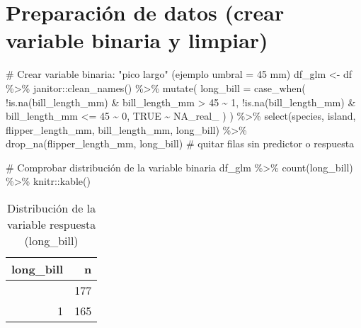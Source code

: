 \documentclass[
  spanish,
  11pt,
  a4paper,
  DIV=11,
  numbers=noendperiod]{scrartcl}
\newenvironment{Shaded}{\begin{snugshade}}{\end{snugshade}}
\newcommand{\AttributeTok}[1]{\textcolor[rgb]{0.40,0.45,0.13}{#1}}
\newcommand{\CommentTok}[1]{\textcolor[rgb]{0.37,0.37,0.37}{#1}}
\newcommand{\ConstantTok}[1]{\textcolor[rgb]{0.56,0.35,0.01}{#1}}
\newcommand{\DecValTok}[1]{\textcolor[rgb]{0.68,0.00,0.00}{#1}}
\newcommand{\FunctionTok}[1]{\textcolor[rgb]{0.28,0.35,0.67}{#1}}
\newcommand{\NormalTok}[1]{\textcolor[rgb]{0.00,0.23,0.31}{#1}}
\newcommand{\OtherTok}[1]{\textcolor[rgb]{0.00,0.23,0.31}{#1}}
\newcommand{\SpecialCharTok}[1]{\textcolor[rgb]{0.37,0.37,0.37}{#1}}
\begin{document}
\section{Preparación de datos (crear variable binaria y
limpiar)}\label{preparaciuxf3n-de-datos-crear-variable-binaria-y-limpiar}

\begin{Shaded}
\begin{Highlighting}[numbers=left,,]
\CommentTok{\# Crear variable binaria: "pico largo" (ejemplo umbral = 45 mm)}
\NormalTok{df\_glm }\OtherTok{\textless{}{-}}\NormalTok{ df }\SpecialCharTok{\%\textgreater{}\%}
\NormalTok{  janitor}\SpecialCharTok{::}\FunctionTok{clean\_names}\NormalTok{() }\SpecialCharTok{\%\textgreater{}\%}
  \FunctionTok{mutate}\NormalTok{(}
    \AttributeTok{long\_bill =} \FunctionTok{case\_when}\NormalTok{(}
      \SpecialCharTok{!}\FunctionTok{is.na}\NormalTok{(bill\_length\_mm) }\SpecialCharTok{\&}\NormalTok{ bill\_length\_mm }\SpecialCharTok{\textgreater{}} \DecValTok{45} \SpecialCharTok{\textasciitilde{}} \DecValTok{1}\NormalTok{,}
      \SpecialCharTok{!}\FunctionTok{is.na}\NormalTok{(bill\_length\_mm) }\SpecialCharTok{\&}\NormalTok{ bill\_length\_mm }\SpecialCharTok{\textless{}=} \DecValTok{45} \SpecialCharTok{\textasciitilde{}} \DecValTok{0}\NormalTok{,}
      \ConstantTok{TRUE} \SpecialCharTok{\textasciitilde{}} \ConstantTok{NA\_real\_}
\NormalTok{    )}
\NormalTok{  ) }\SpecialCharTok{\%\textgreater{}\%}
  \FunctionTok{select}\NormalTok{(species, island, flipper\_length\_mm, bill\_length\_mm, long\_bill) }\SpecialCharTok{\%\textgreater{}\%}
  \FunctionTok{drop\_na}\NormalTok{(flipper\_length\_mm, long\_bill) }\CommentTok{\# quitar filas sin predictor o respuesta}

\CommentTok{\# Comprobar distribución de la variable binaria}
\NormalTok{df\_glm }\SpecialCharTok{\%\textgreater{}\%} 
  \FunctionTok{count}\NormalTok{(long\_bill) }\SpecialCharTok{\%\textgreater{}\%} 
\NormalTok{  knitr}\SpecialCharTok{::}\FunctionTok{kable}\NormalTok{()}
\end{Highlighting}
\end{Shaded}

\begin{longtable}[]{@{}rr@{}}

\caption{\label{tbl-glm-prep}Distribución de la variable respuesta
(long\_bill)}

\tabularnewline

\toprule\noalign{}
long\_bill & n \\
\midrule\noalign{}
\endhead
\bottomrule\noalign{}
\endlastfoot
0 & 177 \\
1 & 165 \\

\end{longtable}
\end{document}
